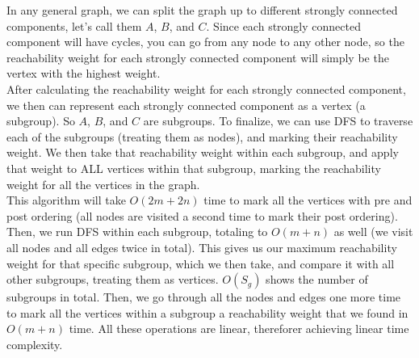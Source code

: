 \documentclass{article}
\begin{document}
\begin{enumerate}
\begin{enumerate}
            In any general graph, we can split the graph up to different strongly connected components, let's call them $A$, $B$, and $C$. Since each strongly connected component will have cycles, you can go from any node to any other node, so the reachability weight for each strongly connected component will simply be the vertex with the highest weight.\\
            After calculating the reachability weight for each strongly connected component, we then can represent each strongly connected component as a vertex (a subgroup). So $A$, $B$, and $C$ are subgroups. To finalize, we can use DFS to traverse each of the subgroups (treating them as nodes), and marking their reachability weight. We then take that reachability weight within each subgroup, and apply that weight to ALL vertices within that subgroup, marking the reachability weight for all the vertices in the graph.\\
            This algorithm will take $O(2m + 2n)$ time to mark all the vertices with pre and post ordering (all nodes are visited a second time to mark their post ordering). Then, we run DFS within each subgroup, totaling to $O(m + n)$ as well (we visit all nodes and all edges twice in total). This gives us our maximum reachability weight for that specific subgroup, which we then take, and compare it with all other subgroups, treating them as vertices. $O(S_g)$ shows the number of subgroups in total. Then, we go through all the nodes and edges one more time to mark all the vertices within a subgroup a reachability weight that we found in $O(m + n)$ time. All these operations are linear, thereforer achieving linear time complexity.
        \end{enumerate}

        
    \end{enumerate} 
\end{document}
